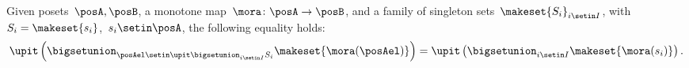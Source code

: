 \begin{lemma}
    \label{lem:unpack_u_functor}
    Given posets~$\posA,\posB$, a monotone map~$\mora \colon \posA \to \posB$, and a family of singleton sets~$\makeset{S_i}_{i\setin I}$, with~$S_i=\makeset{s_i}$,~$s_i\setin \posA$, the following equality holds:
    \begin{equation}
        \label{eq:lemma_unpack}
        \upit \left( \bigsetunion_{\posAel \setin \upit \bigsetunion_{i\setin I}S_i}\makeset{\mora(\posAel)}\right)= \upit \left( \bigsetunion_{i\setin I} \makeset{\mora(s_i)}\right).
    \end{equation}
\end{lemma}


